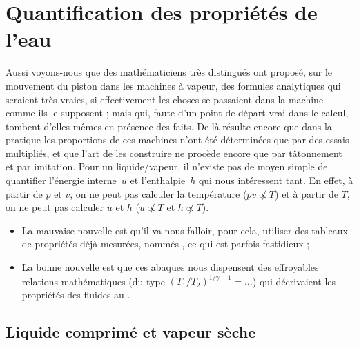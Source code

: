 


\section{Quantification des propriétés de l’eau}

			Aussi voyons-nous que des mathématiciens très distingués ont proposé, sur le mouvement du piston dans les machines à vapeur, des formules analytiques qui seraient très vraies, si effectivement les choses se passaient dans la machine comme ils le supposent ; mais qui, faute d’un point de départ vrai dans le calcul, tombent d’elles-mêmes en présence des faits. De là résulte encore que dans la pratique les proportions de ces machines n’ont été déterminées que par des essais multipliés, et que l’art de les construire ne procède encore que par tâtonnement et par imitation.
	Pour un liquide/vapeur, il n’existe pas de moyen simple de quantifier l’énergie interne~$u$ et l’enthalpie~$h$ qui nous intéressent tant. En effet, à partir de $p$ et $v$, on ne peut pas calculer la température ($p v \not\propto T$) et à partir de $T$, on ne peut pas calculer $u$ et $h$ ($u \not\propto T$ et $h \not\propto T$).
	
	\begin{itemize}
		\item La mauvaise nouvelle est qu’il va nous falloir, pour cela, utiliser des tableaux de propriétés déjà mesurées, nommés , ce qui est parfois fastidieux ;
		\item La bonne nouvelle est que ces abaques nous dispensent des effroyables relations mathématiques (du type $(T_1/T_2)^{1/\gamma-1} = \ldots$) qui décrivaient les propriétés des fluides au \coursquatre.
	\end{itemize}

	\subsection{Liquide comprimé et vapeur sèche}
 		
